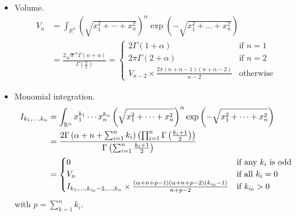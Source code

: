 \documentclass[final]{scrartcl}
\begin{document}
\begin{itemize}
  \item Volume.
    \begin{align}\nonumber
  V_n
    &= \int_{\mathbb{R}^n} \left(\sqrt{x_1^2+\cdots+x_n^2}\right)^\alpha \exp\left(-\sqrt{x_1^2+\dots+x_n^2}\right)\\
    &= \frac{2 \sqrt{\pi}^n \Gamma(n+\alpha)}{\Gamma(\frac{n}{2})}
  = \begin{cases}
    2\Gamma(1+\alpha)&\text{if $n=1$}\\
    2\pi\Gamma(2 + \alpha)&\text{if $n=2$}\\
    V_{n-2} \times \frac{2\pi(n+\alpha-1) (n+\alpha-2)}{n-2}&\text{otherwise}
  \end{cases}
\end{align}

\item Monomial integration.
    \begin{align}\nonumber
  I_{k_1,\dots,k_n}
  &= \int_{\mathbb{R}^n} x_1^{k_1}\cdots x_n^{k_n}
    \left(\sqrt{x_1^2+\dots+x_n^2}\right)^\alpha \exp\left(-\sqrt{x_1^2+\dots+x_n^2}\right)\\
  &= \frac{%
    2 \Gamma\left(\alpha + n + \sum_{i=1}^n k_i\right)
    \left(\prod_{i=1}^n\Gamma\left(\frac{k_i + 1}{2}\right)\right)
  }{%
    \Gamma\left(\sum_{i=1}^n\frac{k_i + 1}{2}\right)
  }\\
  &=\begin{cases}
    0&\text{if any $k_i$ is odd}\\
    V_n&\text{if all $k_i=0$}\\
    I_{k_1,\dots,k_{i_0}-2,\ldots,k_n} \times \frac{%
      (\alpha + n + p - 1) (\alpha + n + p - 2) (k_{i_0} - 1)
    }{%
        n + p - 2
    }&\text{if $k_{i_0} > 0$}
  \end{cases}
\end{align}
with $p=\sum_{k=1}^n k_i$.
\end{itemize}
\end{document}
